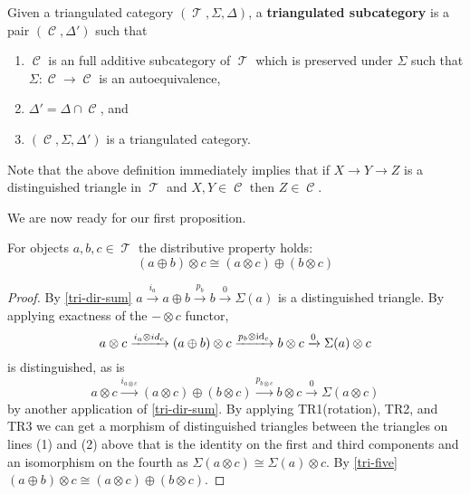 \documentclass[11pt]{article}
\DeclareMathOperator{\CC}{\mathcal{C}}
\DeclareMathOperator{\TT}{\mathcal{T}}
\begin{document}
\begin{defn}
Given a triangulated category $(\TT,\Sigma,\Delta)$, a \textbf{triangulated subcategory} is a pair $(\CC,\Delta')$ such that
\begin{enumerate}[1.]
	\item $\CC$ is an full additive subcategory of $\TT$ which is preserved under $\Sigma$ such that $\Sigma: \CC \to \CC$ is an autoequivalence,
	\item $\Delta' = \Delta \cap \CC$, and
	\item $(\CC,\Sigma,\Delta')$ is a triangulated category.
\end{enumerate}
\end{defn}

\begin{rmk}
Note that the above definition immediately implies that if $X \to Y \to Z$ is a distinguished triangle in $\TT$ and $X,Y \in \CC$ then $Z \in \CC$.
\end{rmk}

We are now ready for our first proposition.

\begin{prop}
For objects $a,b,c \in \TT$ the distributive property holds:
\[
	(a \oplus b) \otimes c \cong (a \otimes c) \oplus (b \otimes c)
\]
\end{prop}
\begin{proof}\label{distribute}
By \autoref{tri-dir-sum} $a \xrightarrow{i_a} a \oplus b \xrightarrow{p_b} b \xrightarrow{0} \Sigma(a) $ is a distinguished triangle. By applying exactness of the $- \otimes c$ functor,
\begin{equation}
	a \otimes c \xrightarrow{i_a \otimes id_c} (a \oplus b) \otimes c \xrightarrow{p_b \otimes \operatorname{id}_c} b \otimes c \xrightarrow{ 0} \Sigma(a) \otimes c
\end{equation}
is distinguished, as is
\begin{equation}
	a \otimes c \xrightarrow{i_{a \otimes c}} (a \otimes c) \oplus (b \otimes c) \xrightarrow{p_{b \otimes c}} b \otimes c \xrightarrow{0} \Sigma(a \otimes c)
\end{equation}
by another application of \autoref{tri-dir-sum}. By applying TR1(rotation), TR2, and TR3 we can get a morphism of distinguished triangles between the triangles on lines (1) and (2) above that is the identity on the first and third components and an isomorphism on the fourth as $\Sigma(a \otimes c) \cong \Sigma(a) \otimes c$. By \autoref{tri-five} $(a \oplus b) \otimes c \cong (a \otimes c) \oplus (b \otimes c)$.
\end{proof}
\end{document}
